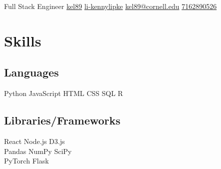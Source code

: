 \documentclass[]{plushcv}
\begin{document}
%
%

    {Full Stack Engineer}
    {
        {\href{https://www.github.com/kel89}{kel89}}
        {\href{https://www.linkedin.com/kennylipke}{li-kennylipke}}
        {\href{mailto:kel89@cornell.edu}{kel89@cornell.edu}}
        {\href{tel:+17162890526}{7162890526}}}


%
%

\begin{minipage}[t]{0.25\textwidth} 

    
    \section{Skills}
    \subsection{Languages}
    \sectionsep
    Python \textbullet{} JavaScript \textbullet{} HTML \textbullet{} CSS \textbullet{} SQL \textbullet{} R
    
    \sectionsep
    \sectionsep
    \subsection{Libraries/Frameworks}
    \sectionsep
    React \textbullet{} Node.js \textbullet{} D3.js \textbullet{} \\Pandas 
        \textbullet{} NumPy \textbullet{} SciPy \textbullet{}\\
         PyTorch \textbullet{} Flask
    

\end{minipage}
\end{document}
